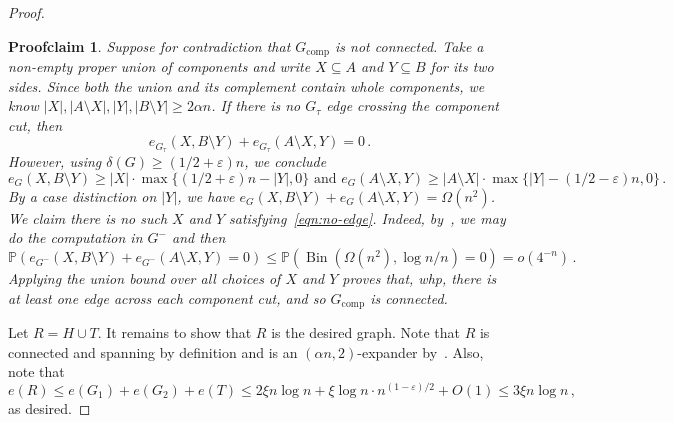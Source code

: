 \documentclass[10pt,a4paper]{amsart}
\newtheorem{proofclaim}{Proofclaim}
\newcommand{\Bin}{\operatorname{Bin}}
\renewcommand{\Pr}{\mathbb{P}}
\newcommand{\eps}{\varepsilon}
\begin{document}
\begin{proof}
\begin{proofclaim}
        Suppose for contradiction that $G_{\mathrm{comp}}$ is not connected. Take a non-empty proper union of components and write $X\subseteq A$ and $Y\subseteq B$ for its two sides. 
        Since both the union and its complement contain whole components, we know $|X|, |A\setminus X|, |Y|, |B\setminus Y|\geq 2\alpha n$. If there is no $G_\tau$ edge crossing the component cut, then 
        \begin{equation}\label{eqn:no-edge}
            e_{G_\tau}(X, B\setminus Y) + e_{G_\tau}(A\setminus X, Y) = 0\,.
        \end{equation}
        However, using $\delta(G) \geq (1/2 + \eps)n$, we conclude 
        \[
            e_G(X,B\setminus Y) \geq |X|\cdot \max\{(1/2+\eps)n - |Y|, 0\} \text{ and } e_G(A\setminus X, Y) \geq |A\setminus X|\cdot \max\{|Y| - (1/2-\eps)n, 0\}\,.
        \]
        By a case distinction on $|Y|$, we have $e_G(X,B\setminus Y) + e_G(A\setminus X, Y)= \Omega(n^2)$. 
        We claim there is no such $X$ and $Y$ satisfying~\eqref{eqn:no-edge}. Indeed, by~, we may do the computation in $G^-$ and then
        \[
            \Pr(e_{G^-}(X, B\setminus Y) + e_{G^-}(A\setminus X, Y) = 0)\leq \Pr(\Bin(\Omega(n^2), \log n/n) = 0) = o(4^{-n})\,.
        \]
        Applying the union bound over all choices of $X$ and $Y$ proves that, whp, there is at least one edge across each component cut, and so $G_{\mathrm{comp}}$ is connected.
    \end{proofclaim}    
  Let $R = H\cup T$. It remains to show that $R$ is the desired graph. Note that $R$ is connected and spanning by definition and is an $(\alpha n,2)$-expander by~.
  Also, note that 
  $$e(R)\leq e(G_1) + e(G_2) + e(T) \leq 2\xi n\log n + \xi \log n\cdot n^{(1-\eps)/2} + O(1)\leq 3\xi n\log n\,,$$
  as desired.
\end{proof}
\end{document}
